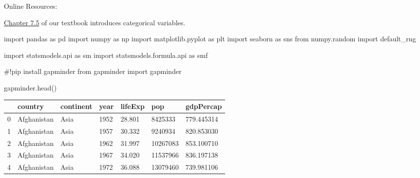 \documentclass[
  letterpaper,
  DIV=11,
  numbers=noendperiod]{scrreprt}
\newenvironment{Shaded}{\begin{snugshade}}{\end{snugshade}}
\newcommand{\CommentTok}[1]{\textcolor[rgb]{0.37,0.37,0.37}{#1}}
\newcommand{\ImportTok}[1]{\textcolor[rgb]{0.00,0.46,0.62}{#1}}
\newcommand{\NormalTok}[1]{\textcolor[rgb]{0.00,0.23,0.31}{#1}}
\begin{document}
Online Resources:

\href{https://wesmckinney.com/book/data-cleaning.html\#pandas-categorical}{Chapter
7.5} of our textbook introduces categorical variables.

\begin{Shaded}
\begin{Highlighting}[]
\ImportTok{import}\NormalTok{ pandas }\ImportTok{as}\NormalTok{ pd}
\ImportTok{import}\NormalTok{ numpy }\ImportTok{as}\NormalTok{ np}
\ImportTok{import}\NormalTok{ matplotlib.pyplot }\ImportTok{as}\NormalTok{ plt}
\ImportTok{import}\NormalTok{ seaborn }\ImportTok{as}\NormalTok{ sns}
\ImportTok{from}\NormalTok{ numpy.random }\ImportTok{import}\NormalTok{ default\_rng}
\end{Highlighting}
\end{Shaded}

\begin{Shaded}
\begin{Highlighting}[]
\ImportTok{import}\NormalTok{ statsmodels.api }\ImportTok{as}\NormalTok{ sm}
\ImportTok{import}\NormalTok{ statsmodels.formula.api }\ImportTok{as}\NormalTok{ smf}
\end{Highlighting}
\end{Shaded}

\begin{Shaded}
\begin{Highlighting}[]
\CommentTok{\#!pip install gapminder}
\ImportTok{from}\NormalTok{ gapminder }\ImportTok{import}\NormalTok{ gapminder}
\end{Highlighting}
\end{Shaded}

\begin{Shaded}
\begin{Highlighting}[]
\NormalTok{gapminder.head()}
\end{Highlighting}
\end{Shaded}

\begin{longtable}[]{@{}lllllll@{}}
\toprule()
& country & continent & year & lifeExp & pop & gdpPercap \\
\midrule()
\endhead
0 & Afghanistan & Asia & 1952 & 28.801 & 8425333 & 779.445314 \\
1 & Afghanistan & Asia & 1957 & 30.332 & 9240934 & 820.853030 \\
2 & Afghanistan & Asia & 1962 & 31.997 & 10267083 & 853.100710 \\
3 & Afghanistan & Asia & 1967 & 34.020 & 11537966 & 836.197138 \\
4 & Afghanistan & Asia & 1972 & 36.088 & 13079460 & 739.981106 \\
\bottomrule()
\end{longtable}
\end{document}
